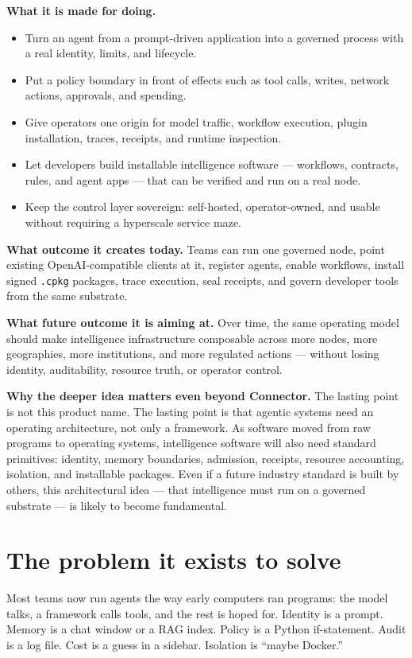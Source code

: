\documentclass[10pt]{article}
\begin{document}
\textbf{What it is made for doing.}
\begin{itemize}
  \item Turn an agent from a prompt-driven application into a governed process with a real identity, limits, and lifecycle.
  \item Put a policy boundary in front of effects such as tool calls, writes, network actions, approvals, and spending.
  \item Give operators one origin for model traffic, workflow execution, plugin installation, traces, receipts, and runtime inspection.
  \item Let developers build installable intelligence software --- workflows, contracts, rules, and agent apps --- that can be verified and run on a real node.
  \item Keep the control layer sovereign: self-hosted, operator-owned, and usable without requiring a hyperscale service maze.
\end{itemize}

\textbf{What outcome it creates today.} Teams can run one governed node, point existing OpenAI-compatible clients at it, register agents, enable workflows, install signed \texttt{.cpkg} packages, trace execution, seal receipts, and govern developer tools from the same substrate.

\textbf{What future outcome it is aiming at.} Over time, the same operating model should make intelligence infrastructure composable across more nodes, more geographies, more institutions, and more regulated actions --- without losing identity, auditability, resource truth, or operator control.

\textbf{Why the deeper idea matters even beyond Connector.} The lasting point is not this product name. The lasting point is that agentic systems need an operating architecture, not only a framework. As software moved from raw programs to operating systems, intelligence software will also need standard primitives: identity, memory boundaries, admission, receipts, resource accounting, isolation, and installable packages. Even if a future industry standard is built by others, this architectural idea --- that intelligence must run on a governed substrate --- is likely to become fundamental.

\section{The problem it exists to solve}

Most teams now run agents the way early computers ran programs: the model talks, a framework calls tools, and the rest is hoped for. Identity is a prompt. Memory is a chat window or a RAG index. Policy is a Python if-statement. Audit is a log file. Cost is a guess in a sidebar. Isolation is ``maybe Docker.''
\end{document}
